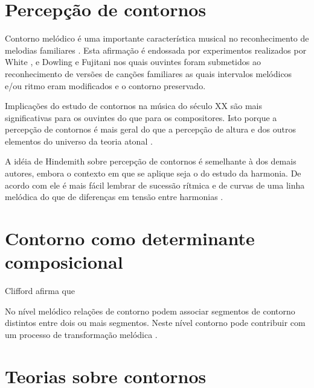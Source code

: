 \section{Percepção de contornos}
\label{sec:perc-de-cont}

Contorno melódico é uma importante característica musical no
reconhecimento de melodias familiares
\cite[p. 136]{dowling.ea86:music}. Esta afirmação é endossada por
experimentos realizados por White \cite{white60:recognition}, e
Dowling e Fujitani \cite{dowling.ea71:contour} nos quais ouvintes
foram submetidos ao reconhecimento de versões de canções familiares as
quais intervalos melódicos e/ou ritmo eram modificados e o contorno
preservado.

Implicações do estudo de contornos na música do século XX são mais
significativas para os ouvintes do que para os compositores. Isto
porque a percepção de contornos é mais geral do que a percepção de
altura e dos outros elementos do universo da teoria atonal
\cite[p. 224]{friedmann85:methodology}.

A idéia de Hindemith sobre percepção de contornos é semelhante à dos
demais autores, embora o contexto em que se aplique seja o do estudo
da harmonia. De acordo com ele é mais fácil lembrar de sucessão
rítmica e de curvas de uma linha melódica do que de diferenças em
tensão entre harmonias \cite[p. 175]{hindemith41:craft}.

\section{Contorno como determinante composicional}
\label{sec:cont-como-determ}

Clifford afirma que



No nível melódico relações de contorno podem associar segmentos de
contorno distintos entre dois ou mais segmentos. Neste nível contorno
pode contribuir com um processo de transformação melódica
\cite[p. 159]{clifford95:contour}.

\section{Teorias sobre contornos}
\label{sec:teor-sobre-cont}

